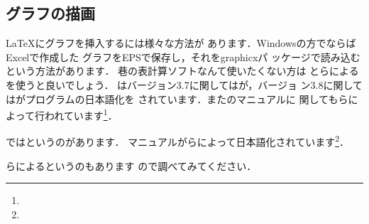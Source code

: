 %


\subsection{グラフの描画}
{\LaTeX}にグラフを挿入するには様々な方法が
あります．Windowsの方でならば{Excel}で作成した
グラフをEPSで保存し，それを\textsf{graphicx}パ
ッケージで読み込むという方法があります．
巷の表計算ソフトなんて使いたくない方は
とらによる
を使うと良いでしょう．
はバージョン3.7に関してはが，バージョ
ン3.8に関してはがプログラムの日本語化を
されています．またのマニュアルに
関してもらによって行われています\footnote{\webGplotman}．

ではというのがあります．
マニュアルがらによって日本語化されています\footnote{\webScilabman}．

らによるというのもあります
ので調べてみてください．

\endinput



